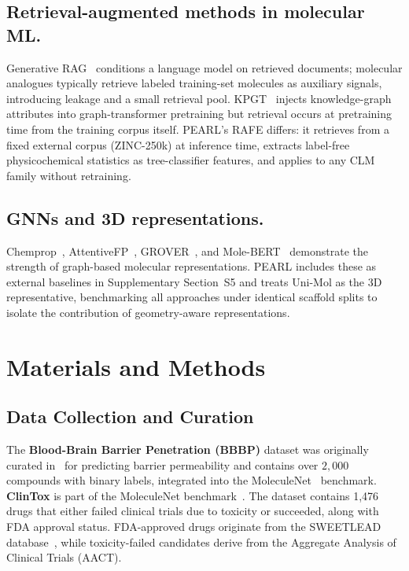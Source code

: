 \documentclass[pdflatex,sn-mathphys-num]{sn-jnl}%
\theoremstyle{thmstyleone}%
\theoremstyle{thmstyletwo}%
\theoremstyle{thmstylethree}%
\begin{document}
\subsection{Retrieval-augmented methods in molecular ML.} \label{RAG}
Generative RAG~\cite{lewis2020rag} conditions a language model on retrieved documents; molecular analogues typically retrieve labeled training-set molecules as auxiliary signals, introducing leakage and a small retrieval pool.
KPGT~\cite{liu2022kpgt} injects knowledge-graph attributes into graph-transformer pretraining but retrieval occurs at pretraining time from the training corpus itself.
PEARL's RAFE differs: it retrieves from a fixed external corpus (ZINC-250k) at inference time, extracts label-free physicochemical statistics as tree-classifier features, and applies to any CLM family without retraining.

\subsection{GNNs and 3D representations.} \label{Graph}
Chemprop~\cite{yang2019chemprop}, AttentiveFP~\cite{xiong2020attentivefp}, GROVER~\cite{rong2020grover}, and Mole-BERT~\cite{xia2023molecbert} demonstrate the strength of graph-based molecular representations.
PEARL includes these as external baselines in Supplementary Section~S5 and treats Uni-Mol as the 3D representative, benchmarking all approaches under identical scaffold splits to isolate the contribution of geometry-aware representations.

\section{Materials and Methods} \label{Materials_Methods}

\subsection{Data Collection and Curation} \label{data_collection}
The \textbf{Blood-Brain Barrier Penetration (BBBP)} dataset was originally curated in~\cite{martins2012bayesian} for predicting barrier permeability and contains over $2,000$ compounds with binary labels, integrated into the MoleculeNet~\cite{wu2018moleculenet} benchmark. \textbf{ClinTox} is part of the MoleculeNet benchmark~\cite{wu2018moleculenet}. The dataset contains 1,476 drugs that either failed clinical trials due to toxicity or succeeded, along with FDA approval status. FDA-approved drugs originate from the SWEETLEAD database~\cite{novick2013sweetlead}, while toxicity-failed candidates derive from the Aggregate Analysis of Clinical Trials (AACT).
\end{document}
